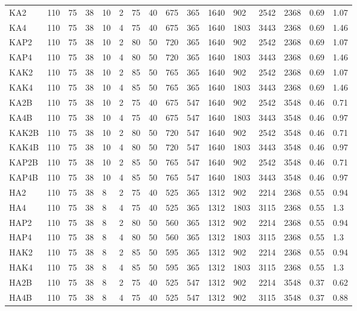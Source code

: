 \begin{table}[htbp]
\begin{tabular}{@{}llllllllllllllll@{}}
KA2 & 110 & 75 & 38 & 10 & 2 & 75 & 40 & 675 & 365 & 1640 & 902 & 2542 & 2368 & 0.69 & 1.07 \\
KA4 & 110 & 75 & 38 & 10 & 4 & 75 & 40 & 675 & 365 & 1640 & 1803 & 3443 & 2368 & 0.69 & 1.46 \\
KAP2 & 110 & 75 & 38 & 10 & 2 & 80 & 50 & 720 & 365 & 1640 & 902 & 2542 & 2368 & 0.69 & 1.07 \\
KAP4 & 110 & 75 & 38 & 10 & 4 & 80 & 50 & 720 & 365 & 1640 & 1803 & 3443 & 2368 & 0.69 & 1.46 \\
KAK2 & 110 & 75 & 38 & 10 & 2 & 85 & 50 & 765 & 365 & 1640 & 902 & 2542 & 2368 & 0.69 & 1.07 \\
KAK4 & 110 & 75 & 38 & 10 & 4 & 85 & 50 & 765 & 365 & 1640 & 1803 & 3443 & 2368 & 0.69 & 1.46 \\
KA2B & 110 & 75 & 38 & 10 & 2 & 75 & 40 & 675 & 547 & 1640 & 902 & 2542 & 3548 & 0.46 & 0.71 \\
KA4B & 110 & 75 & 38 & 10 & 4 & 75 & 40 & 675 & 547 & 1640 & 1803 & 3443 & 3548 & 0.46 & 0.97 \\
KAK2B & 110 & 75 & 38 & 10 & 2 & 80 & 50 & 720 & 547 & 1640 & 902 & 2542 & 3548 & 0.46 & 0.71 \\
KAK4B & 110 & 75 & 38 & 10 & 4 & 80 & 50 & 720 & 547 & 1640 & 1803 & 3443 & 3548 & 0.46 & 0.97 \\
KAP2B & 110 & 75 & 38 & 10 & 2 & 85 & 50 & 765 & 547 & 1640 & 902 & 2542 & 3548 & 0.46 & 0.71 \\
KAP4B & 110 & 75 & 38 & 10 & 4 & 85 & 50 & 765 & 547 & 1640 & 1803 & 3443 & 3548 & 0.46 & 0.97 \\
HA2 & 110 & 75 & 38 & 8 & 2 & 75 & 40 & 525 & 365 & 1312 & 902 & 2214 & 2368 & 0.55 & 0.94 \\
HA4 & 110 & 75 & 38 & 8 & 4 & 75 & 40 & 525 & 365 & 1312 & 1803 & 3115 & 2368 & 0.55 & 1.3 \\
HAP2 & 110 & 75 & 38 & 8 & 2 & 80 & 50 & 560 & 365 & 1312 & 902 & 2214 & 2368 & 0.55 & 0.94 \\
HAP4 & 110 & 75 & 38 & 8 & 4 & 80 & 50 & 560 & 365 & 1312 & 1803 & 3115 & 2368 & 0.55 & 1.3 \\
HAK2 & 110 & 75 & 38 & 8 & 2 & 85 & 50 & 595 & 365 & 1312 & 902 & 2214 & 2368 & 0.55 & 0.94 \\
HAK4 & 110 & 75 & 38 & 8 & 4 & 85 & 50 & 595 & 365 & 1312 & 1803 & 3115 & 2368 & 0.55 & 1.3 \\
HA2B & 110 & 75 & 38 & 8 & 2 & 75 & 40 & 525 & 547 & 1312 & 902 & 2214 & 3548 & 0.37 & 0.62 \\
HA4B & 110 & 75 & 38 & 8 & 4 & 75 & 40 & 525 & 547 & 1312 & 902 & 3115 & 3548 & 0.37 & 0.88 \\

\end{tabular}
\end{table}
